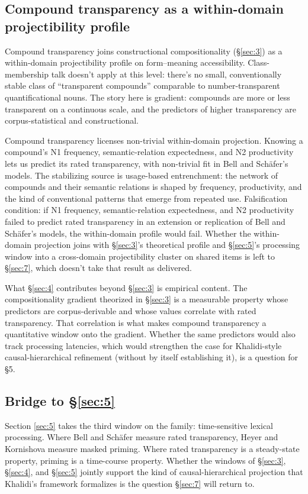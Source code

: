 \subsection{Compound transparency as a within-domain projectibility profile}

Compound transparency joins constructional compositionality (§\ref{sec:3}) as a within-domain projectibility profile on form--meaning accessibility. Class-membership talk doesn't apply at this level: there's no small, conventionally stable class of \enquote{transparent compounds} comparable to number-transparent quantificational nouns. The story here is gradient: compounds are more or less transparent on a continuous scale, and the predictors of higher transparency are corpus-statistical and constructional.

Compound transparency licenses non-trivial within-domain projection. Knowing a compound's \textup{N1} frequency, semantic-relation expectedness, and \textup{N2} productivity lets us predict its rated transparency, with non-trivial fit in Bell and Schäfer's models. The stabilizing source is usage-based entrenchment: the network of compounds and their semantic relations is shaped by frequency, productivity, and the kind of conventional patterns that emerge from repeated use. Falsification condition: if \textup{N1} frequency, semantic-relation expectedness, and \textup{N2} productivity failed to predict rated transparency in an extension or replication of Bell and Schäfer's models, the within-domain profile would fail. Whether the within-domain projection joins with §\ref{sec:3}'s theoretical profile and §\ref{sec:5}'s processing window into a cross-domain projectibility cluster on shared items is left to §\ref{sec:7}, which doesn't take that result as delivered.

What §\ref{sec:4} contributes beyond §\ref{sec:3} is empirical content. The compositionality gradient theorized in §\ref{sec:3} is a measurable property whose predictors are corpus-derivable and whose values correlate with rated transparency. That correlation is what makes compound transparency a quantitative window onto the gradient. Whether the same predictors would also track processing latencies, which would strengthen the case for Khalidi-style causal-hierarchical refinement (without by itself establishing it), is a question for §5.

\subsection{Bridge to §\ref{sec:5}}

Section \ref{sec:5} takes the third window on the family: time-sensitive lexical processing. Where Bell and Schäfer measure rated transparency, Heyer and Kornishova measure masked priming. Where rated transparency is a steady-state property, priming is a time-course property. Whether the windows of §\ref{sec:3}, §\ref{sec:4}, and §\ref{sec:5} jointly support the kind of causal-hierarchical projection that Khalidi's framework formalizes is the question §\ref{sec:7} will return to.
